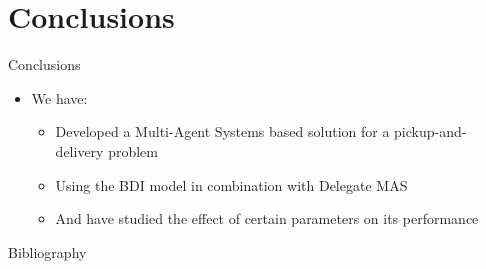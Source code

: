 \section{Conclusions}

\begin{frame}{Conclusions}
    \begin{itemize}
        \item We have:
        \begin{itemize}
            \item Developed a Multi-Agent Systems based solution for a pickup-and-delivery problem
            \item Using the BDI model in combination with Delegate MAS
            \item And have studied the effect of certain parameters on its performance
        \end{itemize}
    \end{itemize}
\end{frame}

\begin{frame}{Bibliography}
    
    
\end{frame}